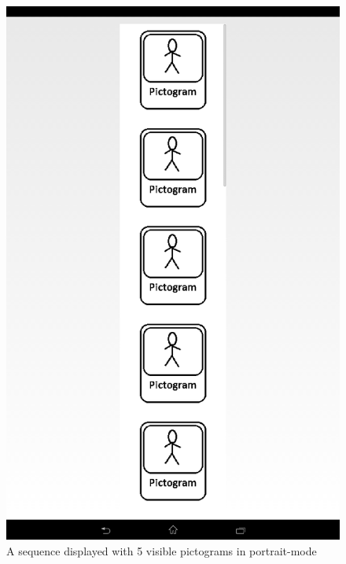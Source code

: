 \begin{figure}[ht!]
\begin{minipage}{.45\textwidth}
\centering
\includegraphics[scale=0.1]{Pics/Sprint3/portrait5pics.png}
\caption{A sequence displayed with 5 visible pictograms in portrait-mode}
\label{fig:portrait5pics}
\end{minipage}
\end{figure}















